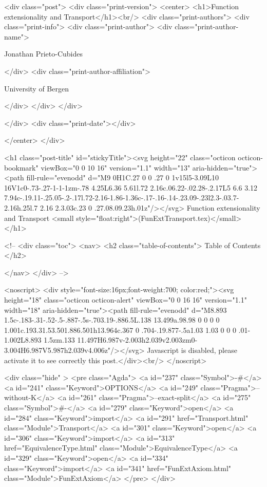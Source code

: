 <div class="post">
  <div class="print-version">
    <center>
      <h1>Function extensionality and Transport</h1><br/>
        <div class="print-authors">
          <div class="print-info">
            <div class="print-author">
              <div class="print-author-name">
                
                  Jonathan Prieto-Cubides
                
              </div>
              <div class="print-author-affiliation">
                
                  University of Bergen
                
                </div>
            </div>
          </div>
          
          
        </div>
        <div class="print-date"></div>
        
        
    </center>
  </div>

  

  <h1 class="post-title" id="stickyTitle"><svg height="22" class="octicon octicon-bookmark" viewBox="0 0 10 16" version="1.1" width="13" aria-hidden="true"><path fill-rule="evenodd" d="M9 0H1C.27 0 0 .27 0 1v15l5-3.09L10 16V1c0-.73-.27-1-1-1zm-.78 4.25L6.36 5.61l.72 2.16c.06.22-.02.28-.2.17L5 6.6 3.12 7.94c-.19.11-.25.05-.2-.17l.72-2.16-1.86-1.36c-.17-.16-.14-.23.09-.23l2.3-.03.7-2.16h.25l.7 2.16 2.3.03c.23 0 .27.08.09.23h.01z"/></svg> Function extensionality and Transport <small style="float:right">(FunExtTransport.tex)</small>
  </h1>

  <!-- 
  <div class="toc">
    <nav>
    <h2 class="table-of-contents"> Table of Contents </h2>
      

    </nav>
  </div>
   -->

  <noscript>
  <div style="font-size:16px;font-weight:700; color:red;"><svg height="18" class="octicon octicon-alert" viewBox="0 0 16 16" version="1.1" width="18" aria-hidden="true"><path fill-rule="evenodd" d="M8.893 1.5c-.183-.31-.52-.5-.887-.5s-.703.19-.886.5L.138 13.499a.98.98 0 0 0 0 1.001c.193.31.53.501.886.501h13.964c.367 0 .704-.19.877-.5a1.03 1.03 0 0 0 .01-1.002L8.893 1.5zm.133 11.497H6.987v-2.003h2.039v2.003zm0-3.004H6.987V5.987h2.039v4.006z"/></svg> Javascript is disabled, please activate it to see correctly this post.</div><br/>
  </noscript>

  <div class="hide" >
<pre class="Agda">
<a id="237" class="Symbol">{-#</a> <a id="241" class="Keyword">OPTIONS</a> <a id="249" class="Pragma">--without-K</a> <a id="261" class="Pragma">--exact-split</a> <a id="275" class="Symbol">#-}</a>
<a id="279" class="Keyword">open</a> <a id="284" class="Keyword">import</a> <a id="291" href="Transport.html" class="Module">Transport</a>
<a id="301" class="Keyword">open</a> <a id="306" class="Keyword">import</a> <a id="313" href="EquivalenceType.html" class="Module">EquivalenceType</a>
<a id="329" class="Keyword">open</a> <a id="334" class="Keyword">import</a> <a id="341" href="FunExtAxiom.html" class="Module">FunExtAxiom</a>
</pre>
</div>

